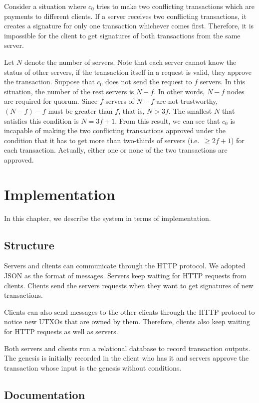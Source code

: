 \documentclass[a4paper, oneside]{discothesis}
\begin{document}
Consider a situation where $c_0$ tries to make two conflicting transactions
which are payments to different clients.
If a server receives two conflicting transactions,
it creates a signature for only one transaction whichever comes first.
Therefore, it is impossible for the client to get signatures of both transactions
from the same server.

Let $N$ denote the number of servers.
Note that each server cannot know the status of other servers,
if the transaction itself in a request is valid, they approve the transaction.
Suppose that $c_0$ does not send the request to $f$ servers.
In this situation, the number of the rest servers is $N-f$.
In other words, $N-f$ nodes are required for quorum.
Since $f$ servers of $N-f$ are not trustworthy, $(N-f)-f$ must be greater than $f$,
that is, $N > 3f$.
The smallest $N$ that satisfies this condition is $N=3f+1$.
From this result, we can see that $c_0$ is incapable of making the two conflicting transactions
approved under the condition that it has to get more than two-thirds of servers
(i.e.\ $\geq2f+1$) for each transaction.
Actually, either one or none of the two transactions are approved.

\chapter{Implementation}
In this chapter, we describe the system in terms of implementation.

\section{Structure}
Servers and clients can communicate through the HTTP protocol.
We adopted JSON as the format of messages.
Servers keep waiting for HTTP requests from clients.
Clients send the servers requests when they want to get signatures of new transactions.

Clients can also send messages to the other clients through the HTTP protocol
to notice new UTXOs that are owned by them.
Therefore, clients also keep waiting for HTTP requests as well as servers.

Both servers and clients run a relational database to record transaction outputs.
The genesis is initially recorded in the client who has it
and servers approve the transaction whose input is the genesis without conditions.



\section{Documentation}
\end{document}
